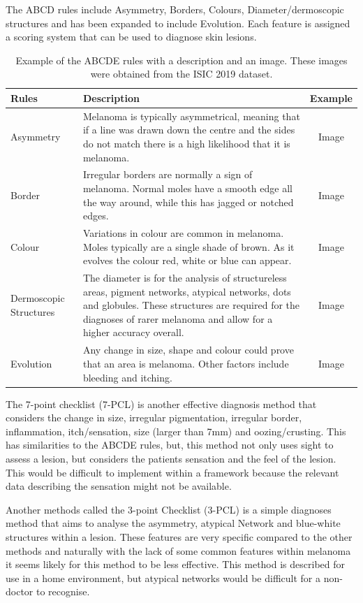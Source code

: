 The ABCD rules include Asymmetry, Borders, Colours, Diameter/dermoscopic structures and has been expanded to include Evolution\cite{Carrera2016}. Each feature is assigned a scoring system that can be used to diagnose skin lesions.

\begin{table}
\begin{tabular}{|p{2.1cm}|p{11.5cm}|c|}
	\hline
	Rules & Description & Example\\
	\hline
	Asymmetry & Melanoma is typically asymmetrical, meaning that if a line was drawn down the centre and the sides do not match there is a high likelihood that it is melanoma. & Image \\
	\hline
	Border & Irregular borders are normally a sign of melanoma. Normal moles have a smooth edge all the way around, while this has jagged or notched edges. & Image \\
	\hline
	Colour & Variations in colour are common in melanoma.  Moles typically are a single
	 shade of brown. As it evolves the colour red, white or blue can appear. & Image \\
	\hline	
	Dermoscopic Structures & The diameter is for the analysis of structureless areas, pigment networks, atypical networks, dots and globules. These structures are required for the diagnoses of rarer melanoma and allow for a higher accuracy overall.& Image \\
	\hline
	Evolution & Any change in size, shape and colour could prove that an area is melanoma. Other factors include bleeding and itching. & Image \\
	\hline
\end{tabular}
\caption{Example of the ABCDE rules with a description and an image. These images were obtained from the ISIC 2019 dataset\cite{Tschandl2018, Codella2018, Combalia2019}.}
\end{table} 

The 7-point checklist (7-PCL) is another effective\cite{Walter2013} diagnosis method that considers the change in size, irregular pigmentation, irregular border, inflammation, itch/sensation, size (larger than 7mm) and oozing/crusting. This has similarities to the ABCDE rules, but, this method not only uses sight to assess a lesion, but considers the patients sensation and the feel of the lesion. This would be difficult to implement within a framework because the relevant data describing the sensation might not be available.

Another methods called the 3-point Checklist (3-PCL) is a simple diagnoses method that aims to analyse the asymmetry, atypical Network and blue-white structures within a lesion. These features are very specific compared to the other methods and naturally with the lack of some common features within melanoma it seems likely for this method to be less effective. This method is described for use in a home environment, but atypical networks would be difficult for a non-doctor to recognise.

